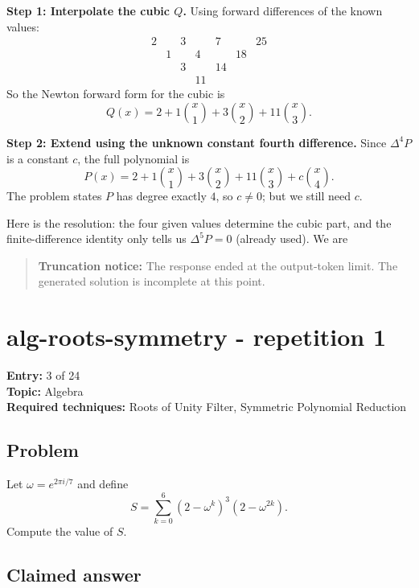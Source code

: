 \documentclass[
  11pt,
  letterpaper,
]{article}
\begin{document}
\textbf{Step 1: Interpolate the cubic \(Q\).} Using forward differences
of the known values: \[\begin{array}{ccccccc}
2 & & 3 & & 7 & & 25\\
& 1 & & 4 & & 18 &\\
& & 3 & & 14 & &\\
& & & 11 & & &
\end{array}\] So the Newton forward form for the cubic is
\[Q(x)=2+1\binom{x}{1}+3\binom{x}{2}+11\binom{x}{3}.\]

\textbf{Step 2: Extend using the unknown constant fourth difference.}
Since \(\Delta^4 P\) is a constant \(c\), the full polynomial is
\[P(x)=2+1\binom{x}{1}+3\binom{x}{2}+11\binom{x}{3}+c\binom{x}{4}.\] The
problem states \(P\) has degree exactly \(4\), so \(c\neq 0\); but we
still need \(c\).

Here is the resolution: the four given values determine the cubic part,
and the finite-difference identity only tells us \(\Delta^5P=0\)
(already used). We are

\begin{quote}
\textbf{Truncation notice:} The response ended at the output-token
limit. The generated solution is incomplete at this point.
\end{quote}

\clearpage

\section{alg-roots-symmetry - repetition
1}\label{alg-roots-symmetry---repetition-1}

\textbf{Entry:} 3 of 24\\
\textbf{Topic:} Algebra\\
\textbf{Required techniques:} Roots of Unity Filter, Symmetric
Polynomial Reduction

\subsection{Problem}\label{problem-2}

Let \(\omega = e^{2\pi i/7}\) and define
\[S = \sum_{k=0}^{6} \left(2 - \omega^k\right)^3 \left(2 - \omega^{2k}\right).\]
Compute the value of \(S\).

\subsection{Claimed answer}\label{claimed-answer-2}
\end{document}
